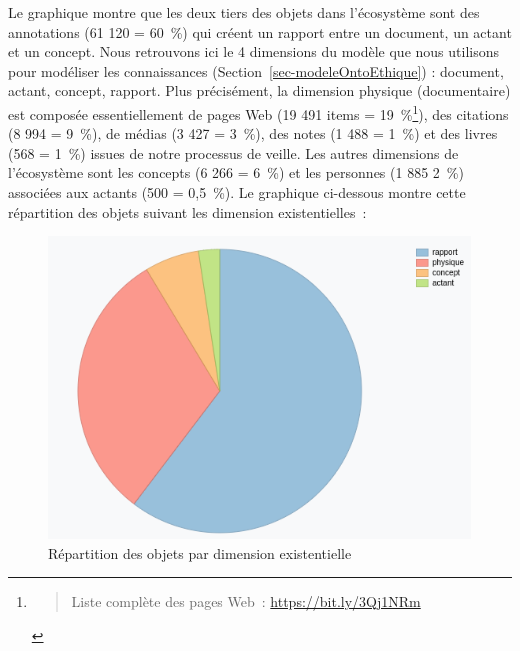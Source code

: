\documentclass[
  letterpaper,
  DIV=11,
  numbers=noendperiod]{scrreprt}
\begin{document}
Le graphique montre que les deux tiers des objets dans l'écosystème sont
des annotations (61 120 = 60~\%) qui créent un rapport entre un
document, un actant et un concept. Nous retrouvons ici le 4 dimensions
du modèle que nous utilisons pour modéliser les connaissances
(Section~\ref{sec-modeleOntoEthique}) : document, actant, concept,
rapport. Plus précisément, la dimension physique (documentaire) est
composée essentiellement de pages Web (19 491 items = 19~\%\footnote{\begin{quote}
  Liste complète des pages Web~: \url{https://bit.ly/3Qj1NRm}
  \end{quote}}), des citations (8 994 = 9~\%), de médias (3 427 = 3~\%),
des notes (1 488 = 1~\%) et des livres (568 = 1~\%) issues de notre
processus de veille. Les autres dimensions de l'écosystème sont les
concepts (6 266 = 6~\%) et les personnes (1 885 2~\%) associées aux
actants (500 = 0,5~\%). Le graphique ci-dessous montre cette répartition
des objets suivant les dimension existentielles~:

\begin{figure}

{\centering \includegraphics[width=11.185cm,height=8.019cm]{media/100000010000021900000181A00CD43E3311E6DF.png}

}

\caption{\label{fig-repartitionDimExi}Répartition des objets par
dimension existentielle}

\end{figure}
\end{document}

